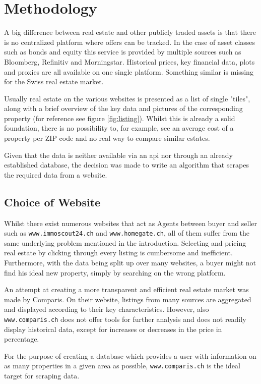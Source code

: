 \documentclass[main]{subfiles}
\begin{document}
\section{Methodology}
A big difference between real estate and other publicly traded assets is that there is no centralized platform where offers can be tracked. 
In the case of asset classes such as bonds and equity this service is provided by multiple sources such as Bloomberg, Refinitiv and Morningstar.
Historical prices, key financial data, plots and proxies are all available on one single platform.
Something similar is missing for the Swiss real estate market. 

Usually real estate on the various websites is presented as a list of single "tiles",
along with a brief overview of the key data and pictures of the corresponding property (for reference see figure \ref{fig:listing}).
Whilst this is already a solid foundation, 
there is no possibility to, for example,
see an average cost of a property per ZIP code and no real way to compare similar estates.

Given that the data is neither available via an \acs*{api} nor through an already established database,
the decision was made to write an algorithm that scrapes the required data from a website.

\subsection{Choice of Website}

Whilst there exist numerous websites that act as Agents between buyer and seller such as \verb|www.immoscout24.ch| and \verb|www.homegate.ch|,
all of them suffer from the same underlying problem mentioned in the introduction. 
Selecting and pricing real estate by clicking through every listing is cumbersome and inefficient.
Furthermore, with the data being split up over many websites, 
a buyer might not find his ideal new property, simply by searching on the wrong platform.

An attempt at creating a more transparent and efficient real estate market was made by Comparis. 
On their website, listings from many sources are aggregated and displayed according to their key characteristics.
However, also \verb|www.comparis.ch| does not offer tools for further analysis and does not readily display historical data,
except for increases or decreases in the price in percentage.

For the purpose of creating a database which provides a user with information on as many properties in a given area as possible, 
\verb|www.comparis.ch| is the ideal target for scraping data.
\end{document}
